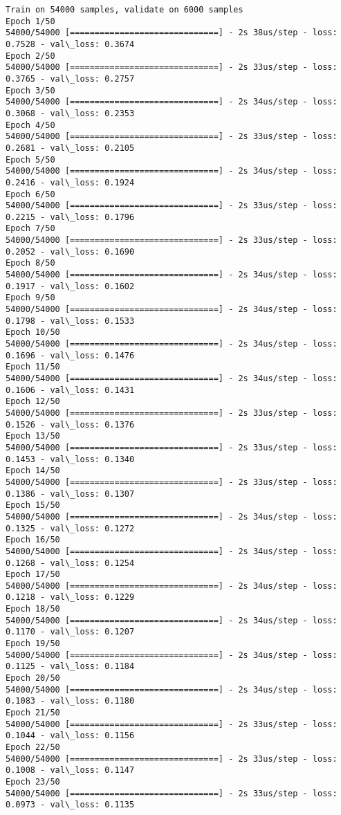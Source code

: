 \documentclass[11pt]{article}
\begin{document}
    \begin{Verbatim}[commandchars=\\\{\}]
Train on 54000 samples, validate on 6000 samples
Epoch 1/50
54000/54000 [==============================] - 2s 38us/step - loss: 0.7528 - val\_loss: 0.3674
Epoch 2/50
54000/54000 [==============================] - 2s 33us/step - loss: 0.3765 - val\_loss: 0.2757
Epoch 3/50
54000/54000 [==============================] - 2s 34us/step - loss: 0.3068 - val\_loss: 0.2353
Epoch 4/50
54000/54000 [==============================] - 2s 33us/step - loss: 0.2681 - val\_loss: 0.2105
Epoch 5/50
54000/54000 [==============================] - 2s 34us/step - loss: 0.2416 - val\_loss: 0.1924
Epoch 6/50
54000/54000 [==============================] - 2s 33us/step - loss: 0.2215 - val\_loss: 0.1796
Epoch 7/50
54000/54000 [==============================] - 2s 33us/step - loss: 0.2052 - val\_loss: 0.1690
Epoch 8/50
54000/54000 [==============================] - 2s 34us/step - loss: 0.1917 - val\_loss: 0.1602
Epoch 9/50
54000/54000 [==============================] - 2s 34us/step - loss: 0.1798 - val\_loss: 0.1533
Epoch 10/50
54000/54000 [==============================] - 2s 34us/step - loss: 0.1696 - val\_loss: 0.1476
Epoch 11/50
54000/54000 [==============================] - 2s 34us/step - loss: 0.1606 - val\_loss: 0.1431
Epoch 12/50
54000/54000 [==============================] - 2s 33us/step - loss: 0.1526 - val\_loss: 0.1376
Epoch 13/50
54000/54000 [==============================] - 2s 33us/step - loss: 0.1453 - val\_loss: 0.1340
Epoch 14/50
54000/54000 [==============================] - 2s 33us/step - loss: 0.1386 - val\_loss: 0.1307
Epoch 15/50
54000/54000 [==============================] - 2s 34us/step - loss: 0.1325 - val\_loss: 0.1272
Epoch 16/50
54000/54000 [==============================] - 2s 34us/step - loss: 0.1268 - val\_loss: 0.1254
Epoch 17/50
54000/54000 [==============================] - 2s 34us/step - loss: 0.1218 - val\_loss: 0.1229
Epoch 18/50
54000/54000 [==============================] - 2s 34us/step - loss: 0.1170 - val\_loss: 0.1207
Epoch 19/50
54000/54000 [==============================] - 2s 34us/step - loss: 0.1125 - val\_loss: 0.1184
Epoch 20/50
54000/54000 [==============================] - 2s 34us/step - loss: 0.1083 - val\_loss: 0.1180
Epoch 21/50
54000/54000 [==============================] - 2s 33us/step - loss: 0.1044 - val\_loss: 0.1156
Epoch 22/50
54000/54000 [==============================] - 2s 33us/step - loss: 0.1008 - val\_loss: 0.1147
Epoch 23/50
54000/54000 [==============================] - 2s 33us/step - loss: 0.0973 - val\_loss: 0.1135

\end{Verbatim}
\end{document}

